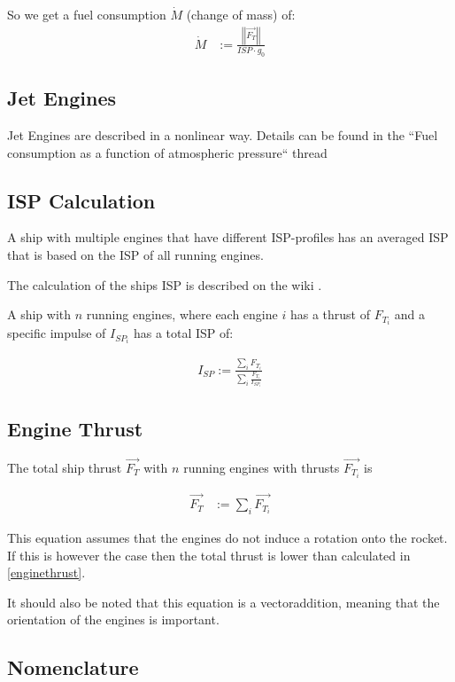 \documentclass[11pt]{report}
\newcommand{\oa}[1]{\overrightarrow{#1}}
\newcommand{\F}[1]{\oa{F_{#1}}}
\newcommand{\absvec}[1]{\left|\left|{#1}\right|\right|}
\begin{document}
So we get a fuel consumption $\dot{M}$ (change of mass) \cite{SPI} of:
\begin{align}
\dot{M} & := \frac{\absvec{\oa{F_T}}}{ISP \cdot g_0}\label{FuelConsumptionEquation}
\end{align}

\subsection{Jet Engines}

Jet Engines are described in a nonlinear way. Details can be found in
the ``Fuel consumption as a function of atmospheric pressure`` thread
\cite{JetEngines}

\subsection{ISP Calculation}

A ship with multiple engines that have different ISP-profiles has an
averaged ISP that is based on the ISP of all running engines.

The calculation of the ships ISP is described on the wiki
\cite{MulEng}.

A ship with $n$ running engines, where each engine $i$ has a thrust of
$F_{T_i}$ and a specific impulse of $I_{SP_i}$ has a total ISP of:

\begin{align}
  I_{SP} := \frac{\sum_i{F_{T_i}}}{\sum_i{\frac{F_{T_i}}{I_{SP_i}}}}
\end{align}

\subsection{Engine Thrust}

The total  ship thrust $\F{T}$ with $n$ running engines
with thrusts $\F{T_i}$ is

\begin{align}
  \F{T} & := \sum_{i}\F{T_i}\label{enginethrust}
\end{align}

This equation assumes that the engines do not induce a rotation onto
the rocket. If this is however the case then the total thrust is lower
than calculated in \eqref{enginethrust}.

It should also be noted that this equation is a vectoraddition,
meaning that the orientation of the engines is important.

\subsection{Nomenclature}
\end{document}
